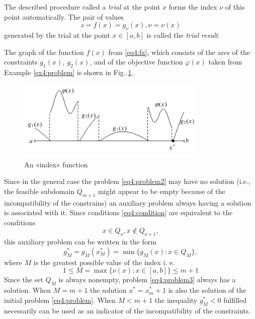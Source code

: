 \documentclass[graybox]{svmult}
\begin{document}
The described procedure called a \emph{trial} at the point $x$ forms the index $\nu$ of this point automatically. The pair of values
\begin{equation}
  \label{eq4:trial}
  z=f(x)=g_\nu(x),\nu=\nu(x)
\end{equation}
generated by the trial at the point $x\in[a,b]$ is called the \emph{trial result}.

The graph of the function $f(x)$ from \eqref{eq4:fx}, which consists of the arcs of the constraints $g_1(x),\:g_2(x)$, and of the objective function $\varphi(x)$ taken from Example \ref{ex4:problem} is shown in Fig. \ref{fig:4_3}.

\begin{figure}[h]
  \label{fig:4_3}
  \centering
  \includegraphics[width=0.8\textwidth]{figures/4_3.png}
  \caption{An «index» function}
\end{figure}

Since in the general case the problem \eqref{eq4:problem2} may have no solution (i.e., the feasible subdomain $Q_{m+1}$ might appear to be empty because of the incompatibility of the constrains) an auxiliary problem always having a solution is associated with it. Since conditions \eqref{eq4:condition} are equivalent to the conditions
\begin{displaymath}
  x\in Q_\nu,x\not\in Q_{\nu+1},
\end{displaymath}
this auxiliary problem can be written in the form
\begin{equation}
  \label{eq4:problem3}
  g_M^*=g_M(x_M^*)=\min\{g_M(x):x\in Q_M\},
\end{equation}
where $M$ is the greatest possible value of the index i. e.
\begin{equation}
  1\le M=\max\{\nu(x):x\in[a,b]\}\le m+1
\end{equation}
Since the set $Q_M$ is always nonempty, problem \eqref{eq4:problem3} always has a solution. When $M=m+1$ the solution $x^*=x^*_m+1$  is also the solution of the initial problem \eqref{eq4:problem}. When $M<m+1$ the inequality $g_M^*<0$ fulfilled necessarily can be used as an indicator of the incompatibility of the constraints.
\end{document}
